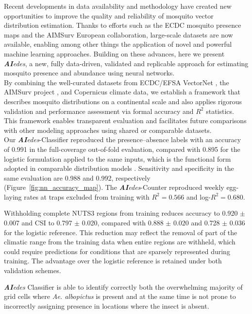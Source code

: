 \documentclass[preprint,12pt]{elsarticle}
\begin{document}
Recent developments in data availability and methodology have created new opportunities to improve the quality and reliability of mosquito vector distribution estimation. Thanks to efforts such as the ECDC mosquito presence maps and the AIMSurv European collaboration, large-scale datasets are now available, enabling among other things the application of novel and powerful machine learning approaches. Building on these advances, here we present \textit{\textbf{AI}edes}, a new, fully data-driven, validated and replicable approach for estimating mosquito presence and abundance using neural networks.\\

By combining the well-curated datasets from ECDC/EFSA VectorNet \cite{ecdc2024a}, the AIMSurv project \cite{miranda2022aimsurv}, and Copernicus climate data, we establish a framework that describes mosquito distributions on a continental scale and also applies rigorous validation and performance assessment via formal accuracy and $R^2$ statistics. This framework enables transparent evaluation and facilitates future comparisons with other modeling approaches using shared or comparable datasets.\\

Our \textit{\textbf{AI}edes}-Classifier reproduced the presence--absence labels with an accuracy of 0.991 in the full-coverage out-of-fold evaluation, compared with 0.895 for the logistic formulation applied to the same inputs, which is the functional form adopted in comparable distribution models \cite{zardini2024}. Sensitivity and specificity in the same evaluation are 0.988 and 0.992, respectively (Figure~\ref{fig:nn_accuracy_map}). The \textit{\textbf{AI}edes}-Counter reproduced weekly egg-laying rates at traps excluded from training with $R^2 = 0.566$ and log-$R^2 = 0.680$.

Withholding complete NUTS3 regions from training reduces accuracy to 0.920 $\pm$ 0.007 and CSI to 0.797 $\pm$ 0.020, compared with 0.888 $\pm$ 0.020 and 0.728 $\pm$ 0.036 for the logistic reference. This reduction may reflect the removal of part of the climatic range from the training data when entire regions are withheld, which could require predictions for conditions that are sparsely represented during training. The advantage over the logistic reference is retained under both validation schemes. 

\textit{\textbf{AI}edes} Classifier is able to identify correctly both the overwhelming majority of grid cells where \emph{Ae. albopictus} is present and at the same time is not prone to incorrectly assigning presence in locations where the insect is absent.\\
\end{document}
